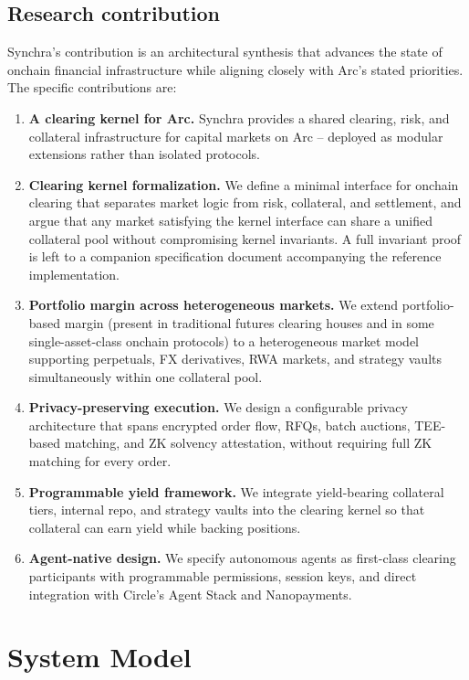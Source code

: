 \documentclass[11pt,a4paper]{article}
\begin{document}
\subsection{Research contribution}

Synchra's contribution is an architectural synthesis that advances the state of onchain financial infrastructure while aligning closely with Arc's stated priorities. The specific contributions are:

\begin{enumerate}
  \item \textbf{A clearing kernel for Arc.} Synchra provides a shared clearing, risk, and collateral infrastructure for capital markets on Arc -- deployed as modular extensions rather than isolated protocols.
  \item \textbf{Clearing kernel formalization.} We define a minimal interface for onchain clearing that separates market logic from risk, collateral, and settlement, and argue that any market satisfying the kernel interface can share a unified collateral pool without compromising kernel invariants. A full invariant proof is left to a companion specification document accompanying the reference implementation.
  \item \textbf{Portfolio margin across heterogeneous markets.} We extend portfolio-based margin (present in traditional futures clearing houses and in some single-asset-class onchain protocols) to a heterogeneous market model supporting perpetuals, FX derivatives, RWA markets, and strategy vaults simultaneously within one collateral pool.
  \item \textbf{Privacy-preserving execution.} We design a configurable privacy architecture that spans encrypted order flow, RFQs, batch auctions, TEE-based matching, and ZK solvency attestation, without requiring full ZK matching for every order.
  \item \textbf{Programmable yield framework.} We integrate yield-bearing collateral tiers, internal repo, and strategy vaults into the clearing kernel so that collateral can earn yield while backing positions.
  \item \textbf{Agent-native design.} We specify autonomous agents as first-class clearing participants with programmable permissions, session keys, and direct integration with Circle's Agent Stack and Nanopayments.
\end{enumerate}

\section{System Model}
\label{sec:model}
\end{document}

